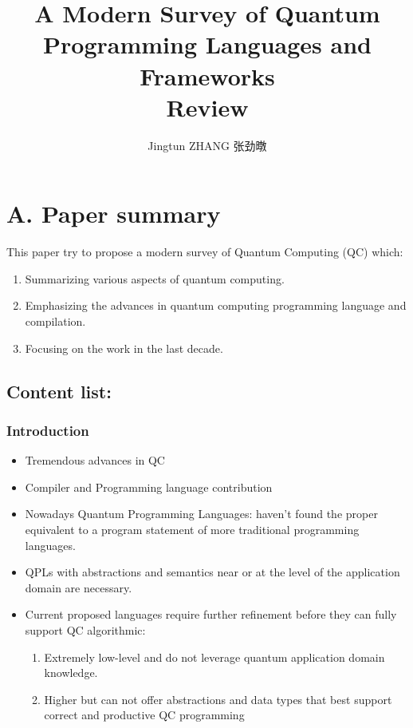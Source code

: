 \documentclass[]{ctexart}
\title{
    A Modern Survey of Quantum Programming Languages and Frameworks\\
    Review
}
\author{
    Jingtun ZHANG 张劲暾
}
\begin{document}
    \maketitle
    \setcounter{secnumdepth}{0} %
    \section{A. Paper summary}
    This paper try to propose a modern survey of Quantum Computing (QC) which:
    \begin{enumerate}
        \item Summarizing various aspects of quantum computing.
        \item Emphasizing the advances in quantum computing programming language and compilation.
        \item Focusing on the work in the last decade.
    \end{enumerate}
    \subsection{Content list:}
        \subsubsection*{Introduction}
            \begin{itemize}
                \item Tremendous advances in QC
                \item Compiler and Programming language contribution
                \item Nowadays Quantum Programming Languages: haven't found the proper equivalent to a 
                program statement of more traditional programming languages.
                \item QPLs with abstractions and semantics near or at the level of the application domain are necessary.
                \item Current proposed languages require further refinement before they can fully support QC algorithmic:
                \begin{enumerate}
                    \item Extremely low-level and do not leverage quantum application domain knowledge.
                    \item Higher but can not offer abstractions and data types that best support correct and productive QC programming
                \end{enumerate}
            \end{itemize}
\end{document}
